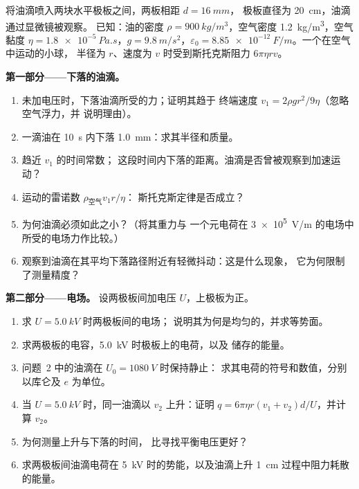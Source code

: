 \begin{problem}
\label{pb:b1:potential-capacitors:1}
将油滴喷入两块水平极板之间，两板相距 $d = \qty{16}{mm}$，
极板直径为 \qty{20}{cm}，油滴通过显微镜被观察。
已知：油的密度 $\rho = \qty{900}{kg/m^3}$，空气密度
\qty{1.2}{kg/m^3}，空气黏度 $\eta = \qty{1.8e-5}{Pa.s}$，$g =
\qty{9.8}{m/s^2}$，$\varepsilon_0 = \qty{8.85e-12}{F/m}$。一个在空气中运动的小球，
半径为 $r$、速度为 $v$ 时受到斯托克斯阻力 $6\pi\eta rv$。

\medskip
\noindent\textbf{第一部分——下落的油滴。}
\begin{enumerate}
  \item 未加电压时，下落油滴所受的力；证明其趋于
        终端速度 $v_1 = 2\rho gr^2/9\eta$（忽略空气浮力，并
        说明理由）。
  \item 一滴油在 \qty{10}{s} 内下落 \qty{1.0}{mm}：求其半径和质量。
  \item 趋近 $v_1$ 的时间常数；
        这段时间内下落的距离。油滴是否曾被观察到加速运动？
  \item 运动的雷诺数 $\rho_{\text{空气}}v_1r/\eta$：
        斯托克斯定律是否成立？
  \item 为何油滴必须如此之小？（将其重力与
        一个元电荷在
        \qty{3e5}{V/m} 的电场中所受的电场力作比较。）
  \item 观察到油滴在其平均下落路径附近有轻微抖动：这是什么现象，
        它为何限制了测量精度？
\end{enumerate}

\medskip
\noindent\textbf{第二部分——电场。}
设两极板间加电压 $U$，上极板为正。
\begin{enumerate}[resume]
  \item 求 $U = \qty{5.0}{kV}$ 时两极板间的电场；
        说明其为何是均匀的，并求等势面。
  \item 求两极板的电容，\qty{5.0}{kV} 时极板上的电荷，以及
        储存的能量。
  \item 问题~2 中的油滴在 $U_0 = \qty{1080}{V}$ 时保持静止：
        求其电荷的符号和数值，分别以库仑及 $e$ 为单位。
  \item 当 $U = \qty{5.0}{kV}$ 时，同一油滴以 $v_2$ 上升：证明
        $q = 6\pi\eta r(v_1 + v_2)d/U$，并计算 $v_2$。
  \item 为何测量上升与下落的时间，
        比寻找平衡电压更好？
  \item 求两极板间油滴电荷在
        \qty{5}{kV} 时的势能，以及油滴上升
        \qty{1}{cm} 过程中阻力耗散的能量。
\end{enumerate}


\end{problem}
